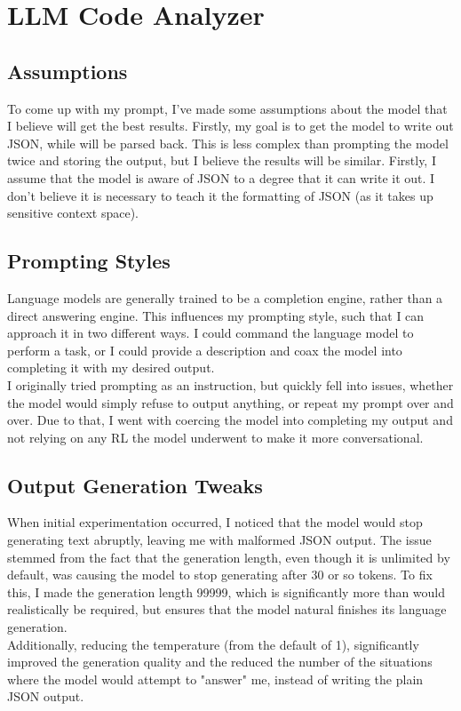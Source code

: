\documentclass{article}
\begin{document}
\section*{LLM Code Analyzer}
	\subsection{Assumptions}
		To come up with my prompt, I've made some assumptions about the model that I believe will get the best results. Firstly, my goal is to get the model to write out JSON, while will be parsed back. This is less complex than prompting the model twice and storing the output, but I believe the results will be similar. Firstly, I assume that the model is aware of JSON to a degree that it can write it out. I don't believe it is necessary to teach it the formatting of JSON (as it takes up sensitive context space).

	\subsection{Prompting Styles}
		Language models are generally trained to be a completion engine, rather than a direct answering engine. This influences my prompting style, such that I can approach it in two different ways. I could command the language model to perform a task, or I could provide a description and coax the model into completing it with my desired output. \\
		I originally tried prompting as an instruction, but quickly fell into issues, whether the model would simply refuse to output anything, or repeat my prompt over and over. Due to that, I went with coercing the model into completing my output and not relying on any RL the model underwent to make it more conversational. 
	
	\subsection{Output Generation Tweaks}
		When initial experimentation occurred, I noticed that the model would stop generating text abruptly, leaving me with malformed JSON output. The issue stemmed from the fact that the generation length, even though it is unlimited by default, was causing the model to stop generating after 30 or so tokens. To fix this, I made the generation length 99999, which is significantly more than would realistically be required, but ensures that the model natural finishes its language generation. \\
		Additionally, reducing the temperature (from the default of 1), significantly improved the generation quality and the reduced the number of the situations where the model would attempt to "answer" me, instead of writing the plain JSON output.
\end{document}
